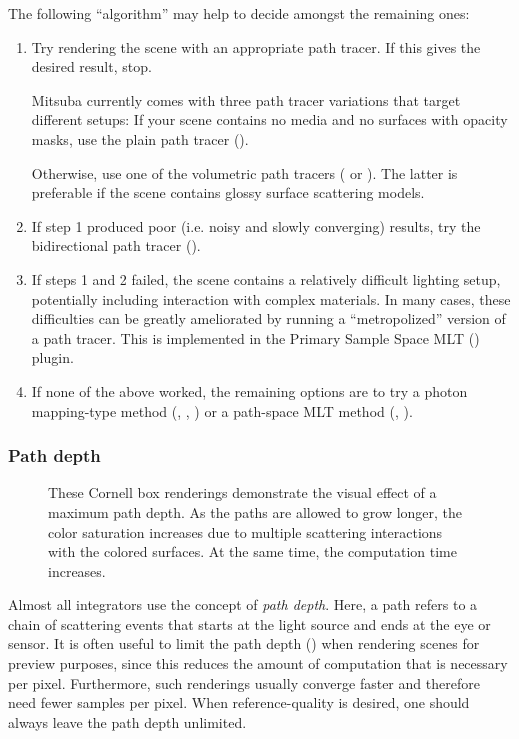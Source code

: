 The following ``algorithm'' may help to decide amongst the remaining ones:
\begin{enumerate}
\item Try rendering the scene with an appropriate path tracer. If this gives the desired result, stop.

Mitsuba currently comes with three path tracer variations that target different setups: If your
scene contains no media and no surfaces with opacity masks, use the plain path tracer ().

Otherwise, use one of the volumetric path tracers (
or ). The latter is preferable if the scene contains glossy surface scattering models.
\item If step 1 produced poor (i.e. noisy and slowly converging) results, try
the bidirectional path tracer ().
\item If steps 1 and 2 failed, the scene contains a relatively difficult lighting setup, potentially
including interaction with complex materials.
In many cases, these difficulties can be greatly ameliorated by running a ``metropolized'' version
of a path tracer. This is implemented in the Primary Sample Space MLT () plugin.
\item If none of the above worked, the remaining options are to try a photon mapping-type
method (, , ) or a path-space MLT
method (, ).
\end{enumerate}

\subsubsection*{Path depth}
\begin{figure}[htb!]
\centering
\hfill
{}
\caption{
    \label{fig:pathdepths}
    These Cornell box renderings demonstrate the visual
    effect of a maximum path depth. As the paths
    are allowed to grow longer, the color saturation
    increases due to multiple scattering interactions
    with the colored surfaces. At the same time, the
    computation time increases.
}
\end{figure}

Almost all integrators use the concept of \emph{path depth}.
Here, a path refers to a chain of scattering events that
starts at the light source and ends at the eye or sensor.
It is often useful to limit the path depth ()
when rendering scenes for preview purposes, since this reduces the amount
of computation that is necessary per pixel. Furthermore, such renderings
usually converge faster and therefore need fewer samples per pixel.
When reference-quality is desired, one should always leave the path
depth unlimited.

